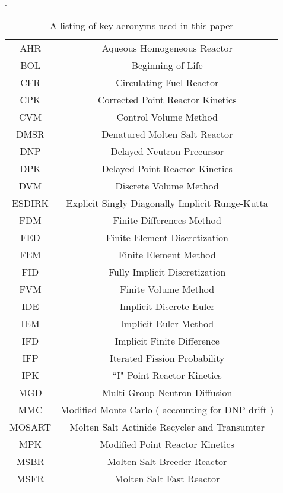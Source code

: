 \documentclass[review]{elsarticle}
\begin{document}
\begin{table}[h]
    \caption{A listing of key acronyms used in this paper}.
    \label{tbl:nomen}
    \begin{center}
        \begin{tabular}{|c c|}
            \hline
            AHR & Aqueous Homogeneous Reactor \\
            BOL & Beginning of Life \\
            CFR & Circulating Fuel Reactor \\
            CPK & Corrected Point Reactor Kinetics \\
            CVM & Control Volume Method \\
            DMSR & Denatured Molten Salt Reactor \\ 
            DNP & Delayed Neutron Precursor \\
            DPK & Delayed Point Reactor Kinetics \\
            DVM & Discrete Volume Method \\
            ESDIRK & Explicit Singly Diagonally Implicit Runge-Kutta \\
            FDM & Finite Differences Method \\
            FED & Finite Element Discretization \\
            FEM & Finite Element Method \\
            FID & Fully Implicit Discretization \\
            FVM & Finite Volume Method \\
            IDE & Implicit Discrete Euler \\
            IEM & Implicit Euler Method \\
            IFD & Implicit Finite Difference \\
            IFP & Iterated Fission Probability \\
            IPK & ``I" Point Reactor Kinetics \\
            MGD & Multi-Group Neutron Diffusion \\
            MMC & Modified Monte Carlo ( accounting for DNP drift ) \\
            MOSART & Molten Salt Actinide Recycler and Transumter \\
            MPK & Modified Point Reactor Kinetics \\
            MSBR & Molten Salt Breeder Reactor \\
            MSFR & Molten Salt Fast Reactor \\

\end{tabular}
\end{center}
\end{table}
\end{document}
